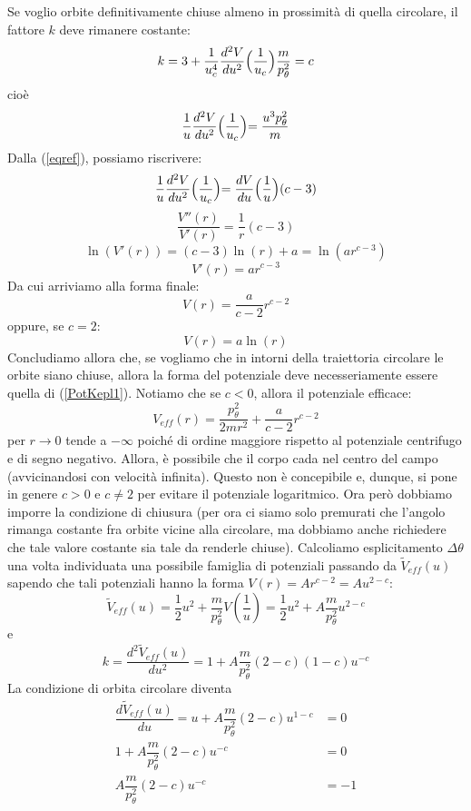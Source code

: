 \documentclass[a4paper,openany]{article}
\begin{document}
	Se voglio orbite definitivamente chiuse almeno in prossimità di quella circolare, il fattore $k$ deve rimanere costante:
	$$
	k = 3 + \dfrac{1}{u_c^4}\dfrac{d^2 V}{du^2}\Bigl(\dfrac{1}{u_c}\Bigl) \dfrac{m}{p_\theta^2} = c
	$$
	cioè
	$$
	\dfrac{1}{u}\dfrac{d^2 V}{du^2}\Bigl(\dfrac{1}{u_c}\Bigl) =  \dfrac{u^3 p_{\theta}^2}{m}
	$$
	Dalla (\ref{eqref}), possiamo riscrivere:
	\begin{equation}\label{key}
		\dfrac{1}{u}\dfrac{d^2 V}{du^2}\Bigl(\dfrac{1}{u_c}\Bigl) = \dfrac{dV}{du}\Bigl(\dfrac{1}{u}\Bigl) (c-3)
	\end{equation}
	$$
	\dfrac{V''(r)}{V'(r)} = \dfrac{1}{r}(c-3)
	$$
	$$
	\ln(V'(r)) = (c-3)\ln(r) + a = \ln(ar^{c-3})
	$$
	$$
	V'(r) = ar^{c-3}
	$$
	Da cui arriviamo alla forma finale:
	\begin{equation}
		V(r) = \dfrac{a}{c-2}r^{c-2}
		\label{PotKepl1}
	\end{equation}
	oppure, se $c=2$:
	$$
	V(r) = a\ln(r)
	$$
	Concludiamo allora che, se vogliamo che in intorni della traiettoria circolare le orbite siano chiuse, allora la forma del potenziale deve necesseriamente essere quella di (\ref{PotKepl1}). Notiamo che se $c<0$, allora il potenziale efficace:
	$$
	V_{eff}(r) = \dfrac{p_{\theta}^{2}}{2mr^2}+\dfrac{a}{c-2}r^{c-2}
	$$
	per $r\to 0$ tende a $-\infty$ poiché di ordine maggiore rispetto al potenziale centrifugo e di segno negativo. Allora, è possibile che il corpo cada nel centro del campo (avvicinandosi con velocità infinita). Questo non è concepibile e, dunque, si pone in genere $c>0$ e $c\neq2$ per evitare il potenziale logaritmico. Ora però dobbiamo imporre la condizione di chiusura (per ora ci siamo solo premurati che l'angolo rimanga costante fra orbite vicine alla circolare, ma dobbiamo anche richiedere che tale valore costante sia tale da renderle chiuse). Calcoliamo esplicitamento $\Delta\theta$ una volta individuata una possibile famiglia di potenziali passando da $\tilde{V}_{eff}(u)$ sapendo che tali potenziali hanno la forma $V(r)=Ar^{c-2} = A u^{2-c}$:
	$$
	\tilde{V}_{eff}(u) = \dfrac{1}{2}u^2 + \dfrac{m}{p_{\theta}^2} V(\dfrac{1}{u}) = \dfrac{1}{2}u^2 +A \dfrac{m}{p_{\theta}^2}u^{2-c}
	$$
	e
	$$
	k = \dfrac{d^2\tilde{V}_{eff}(u)}{du^2} = 1+ A \dfrac{m}{p_{\theta}^2}(2-c)(1-c)u^{-c}
	$$
	La condizione di orbita circolare diventa
	\begin{equation}
		\begin{aligned}
			\dfrac{d\tilde{V}_{eff}(u)}{du}= u+A\dfrac{m}{p_{\theta}^2}(2-c)u^{1-c}&=0 \\
			1 +A\dfrac{m}{p_{\theta}^2}(2-c)u^{-c} &=0 \\
			A\dfrac{m}{p_{\theta}^2}(2-c)u^{-c} &=-1 
		\end{aligned}
	\end{equation}
\end{document}
